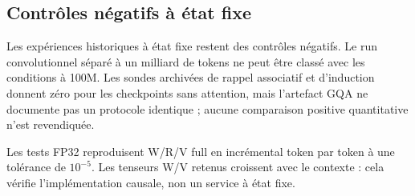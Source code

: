 \subsection{Contrôles négatifs à état fixe}

Les expériences historiques à état fixe restent des contrôles négatifs. Le run convolutionnel séparé à un milliard de tokens ne peut être classé avec les conditions à 100M. Les sondes archivées de rappel associatif et d'induction donnent zéro pour les checkpoints sans attention, mais l'artefact GQA ne documente pas un protocole identique ; aucune comparaison positive quantitative n'est revendiquée.

Les tests FP32 reproduisent W/R/V full en incrémental token par token à une tolérance de $10^{-5}$. Les tenseurs W/V retenus croissent avec le contexte : cela vérifie l'implémentation causale, non un service à état fixe.